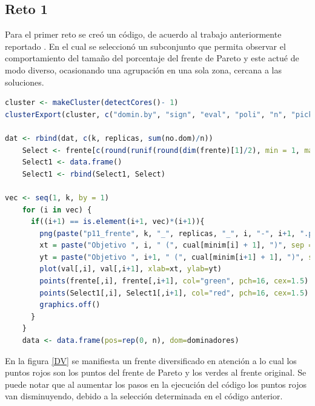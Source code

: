 \documentclass[12pt, letterpaper] {article}
\begin{document}
\subsection{Reto 1}

Para el primer reto se creó un código, de acuerdo al trabajo anteriormente reportado \cite{P11}. En el cual se seleccionó un subconjunto que permita observar el comportamiento del tamaño del porcentaje del frente de Pareto y este actué de modo diverso, ocasionando una agrupación en una sola zona, cercana a las soluciones.\\

\begin{lstlisting}[language=R]
cluster <- makeCluster(detectCores()- 1)
clusterExport(cluster, c("domin.by", "sign", "eval", "poli", "n", "pick.one"))

dat <- rbind(dat, c(k, replicas, sum(no.dom)/n))
    Select <- frente[c(round(runif(round(dim(frente)[1]/2), min = 1, max = dim(frente)[1]))),]
    Select1 <- data.frame()
    Select1 <- rbind(Select1, Select)

vec <- seq(1, k, by = 1)
    for (i in vec) {
      if((i+1) == is.element(i+1, vec)*(i+1)){
        png(paste("p11_frente", k, "_", replicas, "_", i, "-", i+1, ".png", sep=""))
        xt = paste("Objetivo ", i, " (", cual[minim[i] + 1], ")", sep = "")
        yt = paste("Objetivo ", i+1, " (", cual[minim[i+1] + 1], ")", sep = "")
        plot(val[,i], val[,i+1], xlab=xt, ylab=yt)
        points(frente[,i], frente[,i+1], col="green", pch=16, cex=1.5)
        points(Select1[,i], Select1[,i+1], col="red", pch=16, cex=1.5)
        graphics.off()
      }
    }
    data <- data.frame(pos=rep(0, n), dom=dominadores)
\end{lstlisting}

En la figura \ref{DV} se manifiesta un frente diversificado en atención a lo cual los puntos rojos son los puntos del frente de Pareto y los verdes al frente original.  Se puede notar que al aumentar los pasos en la ejecución del código los puntos rojos van disminuyendo, debido a la selección determinada en el código anterior.
\end{document}
